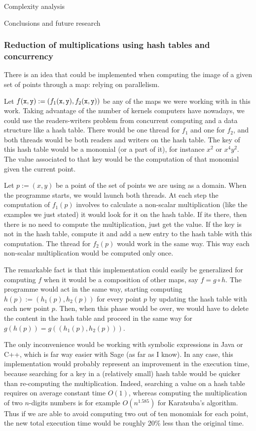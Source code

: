 \documentclass[11pt, a4paper, english, twoside, notitlepage, openright]{report}
\begin{document}
\begin{chapter}{Complexity analysis}
\begin{section}{Conclusions and future research}
\subsubsection{Reduction of multiplications using hash tables and concurrency}

There is an idea that could be implemented when computing the image of a given set of points through a map: relying on parallelism.

Let $f({\tt x},{\tt y}):=(f_1({\tt x},{\tt y}),f_2({\tt x},{\tt y}))$ be any of the maps we were working with in this work. Taking advantage of the number of kernels computers have nowadays, we could use the readers-writers problem from concurrent computing and a data structure like a hash table. There would be one thread for $f_1$ and one for $f_2$, and both threads would be both readers and writers on the hash table. The key of this hash table would be a monomial (or a part of it), for instance $x^2$ or $x^4y^2$. The value associated to that key would be the computation of that monomial given the current point.

Let $p:=(x,y)$ be a point of the set of points we are using as a domain. When the programme starts, we would launch both threads. At each step the computation of $f_1(p)$ involves to calculate a non-scalar multiplication (like the examples we just stated) it would look for it on the hash table. If its there, then there is no need to compute the multiplication, just get the value. If the key is not in the hash table, compute it and add a new entry to the hash table with this computation. The thread for $f_2(p)$ would work in the same way. This way each non-scalar multiplication would be computed only once.

The remarkable fact is that this implementation could easily be generalized for computing $f$ when it would be a composition of other maps, say $f=g\circ h$. The programme would act in the same way, starting computing $h(p):=(h_1(p), h_2(p))$ for every point $p$ by updating the hash table with each new point $p$. Then, when this phase would be over, we would have to delete the content in the hash table and proceed in the same way for $g(h(p))= g((h_1(p), h_2(p)))$.

The only inconvenience would be working with symbolic expressions in Java or C++, which is far way easier with Sage (as far as I know). In any case, this implementation would probably represent an improvement in the execution time, because searching for a key in a (relatively small) hash table would be quicker than re-computing the multiplication. Indeed, searching a value on a hash table requires on average constant time $O(1)$, whereas computing the multiplication of two $n$-digits numbers is for example $O(n^{1.585})$ for Karatsuba's algorithm. Thus if we are able to avoid computing two out of ten monomials for each point, the new total execution time would be roughly 20\% less than the original time.
\end{section}


\end{chapter}
\end{document}
